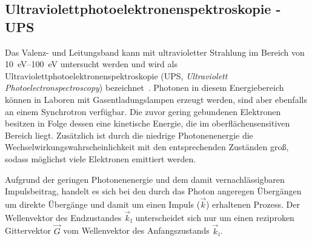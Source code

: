         \subsection{Ultraviolettphotoelektronenspektroskopie - UPS} \label{sec:UPS}
            Das Valenz- und Leitungsband kann mit ultravioletter Strahlung im Bereich von \SIrange{10}{100}{\electronvolt} untersucht werden und wird als Ultraviolettphotoelektronenspektroskopie (UPS, \textit{Ultraviolett Photoelectronspectroscopy}) bezeichnet~\cite{Fauster}.
            Photonen in diesem Energiebereich können in Laboren mit Gasentladungslampen erzeugt werden, sind aber ebenfalls an einem Synchrotron verfügbar.
            Die zuvor gering gebundenen Elektronen besitzen in Folge dessen eine kinetische Energie, die im oberflächensensitiven Bereich liegt.
            Zusätzlich ist durch die niedrige Photonenenergie die Wechselwirkungswahrscheinlichkeit mit den entsprechenden Zuständen groß, sodass möglichst viele Elektronen emittiert werden.

            Aufgrund der geringen Photonenenergie und dem damit vernachlässigbaren Impulsbeitrag, handelt es sich bei den durch das Photon angeregen Übergängen um direkte Übergänge und damit um einen Impuls ($\vec{k}$) erhaltenen Prozess.
            Der Wellenvektor des Endzustandes $\vec{k}_\text{f}$ unterscheidet sich nur um einen reziproken Gittervektor $\vec{G}$ vom Wellenvektor des Anfangszustands $\vec{k}_\text{i}$.

